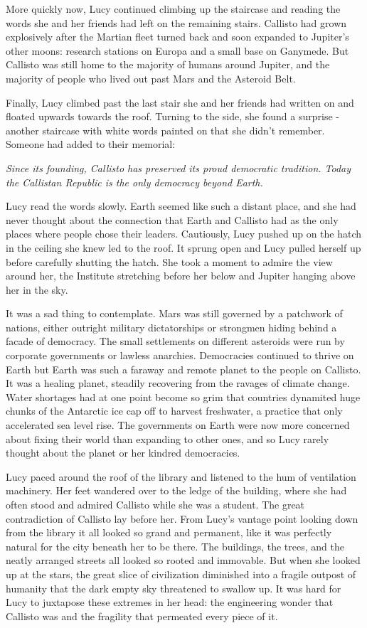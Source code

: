 \documentclass[openany, 12pt]{book} %
\begin{document}
More quickly now, Lucy continued climbing up the staircase and reading the words she and her friends had left on the remaining stairs. Callisto had grown explosively after the Martian fleet turned back and soon expanded to Jupiter's other moons: research stations on Europa and a small base on Ganymede. But Callisto was still home to the majority of humans around Jupiter, and the majority of people who lived out past Mars and the Asteroid Belt.

Finally, Lucy climbed past the last stair she and her friends had written on and floated upwards towards the roof. Turning to the side, she found a surprise - another staircase with white words painted on that she didn't remember. Someone had added to their memorial:

\textit{Since its founding, Callisto has preserved its proud democratic tradition. Today the Callistan Republic is the only democracy beyond Earth.}

Lucy read the words slowly. Earth seemed like such a distant place, and she had never thought about the connection that Earth and Callisto had as the only places where people chose their leaders. Cautiously, Lucy pushed up on the hatch in the ceiling she knew led to the roof. It sprung open and Lucy pulled herself up before carefully shutting the hatch. She took a moment to admire the view around her, the Institute stretching before her below and Jupiter hanging above her in the sky.

It was a sad thing to contemplate. Mars was still governed by a patchwork of nations, either outright military dictatorships or strongmen hiding behind a facade of democracy. The small settlements on different asteroids were run by corporate governments or lawless anarchies. Democracies continued to thrive on Earth but Earth was such a faraway and remote planet to the people on Callisto. It was a healing planet, steadily recovering from the ravages of climate change. Water shortages had at one point become so grim that countries dynamited huge chunks of the Antarctic ice cap off to harvest freshwater, a practice that only accelerated sea level rise. The governments on Earth were now more concerned about fixing their world than expanding to other ones, and so Lucy rarely thought about the planet or her kindred democracies. 

Lucy paced around the roof of the library and listened to the hum of ventilation machinery. Her feet wandered over to the ledge of the building, where she had often stood and admired Callisto while she was a student. The great contradiction of Callisto lay before her. From Lucy's vantage point looking down from the library it all looked so grand and permanent, like it was perfectly natural for the city beneath her to be there. The buildings, the trees, and the neatly arranged streets all looked so rooted and immovable. But when she looked up at the stars, the great slice of civilization diminished into a fragile outpost of humanity that the dark empty sky threatened to swallow up. It was hard for Lucy to juxtapose these extremes in her head: the engineering wonder that Callisto was and the fragility that permeated every piece of it.
\end{document}
